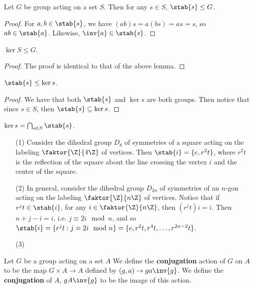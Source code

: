 \begin{lemma}\label{2.2.4}
    Let $G$ be group acting on a set  $S$. Then for any  $s \in S$,  $\stab{s}
    \leq G$.
\end{lemma}
\begin{proof}
    For $a,b \in \stab{s}$, we have $(ab)s=a(bs)=as=s$, so $ab \in \stab{a}$.
    Likewise, $\inv{a} \in \stab{s}$.
\end{proof}
\begin{corollary}
    $\ker{S} \leq G$.
\end{corollary}
\begin{proof}
    The proof is identical to that of the above lemma.
\end{proof}
\begin{corollary}
    $\stab{s} \leq \ker{s}$.
\end{corollary}
\begin{proof}
    We have that both $\stab{s}$ and $\ker{s}$ are both groups. Then notice that
    since $s \in S$, then  $\stab{s} \subseteq \ker{s}$.
\end{proof}
\begin{corollary}
    $\ker{s}=\bigcap_{s \in S}{\stab{s}}$.
\end{corollary}

\begin{example}
    \begin{enumerate}
        \item[(1)] Consider the dihedral group $D_8$ of symmetries of a square
            acting on the labeling $\faktor{\Z}{4\Z}$ of vertices. Then
            $\stab{i}=\{e,r^2t\}$, where  $r^2t$ is the reflection of the square
            about the line crossing the vertex  $i$ and the center of the
            square.

        \item [(2)] In general, consider the dihedral group $D_{2n}$ of
            symmetries of an $n$-gon acting on the labeling  $\faktor{\Z}{n\Z}$
            of vertices. Notice that if  $r^jt \in \stab{i}$, for any $i \in
            \faktor{\Z}{n\Z}$, then $(r^jt)i=i$. Then $n+j-i=i$, i.e. $j \equiv
            2i \mod{n}$, and so $\stab{i}=\{r^jt : j \equiv 2i \mod{n}\}=\{e,
            r^2t, r^4t, \dots, r^{2n-2}t\}$.

        \item[(3)]
    \end{enumerate}
\end{example}

\begin{definition}
    Let $G$ be a group acting on a set $A$ We define the \textbf{conjugation}
    action of $G$ on  $A$ to be the map $G \times A \rightarrow A$
    defined by $(g,a) \rightarrow ga\inv{g}$. We define the \textbf{conjugation}
    of $A$, $gA\inv{g}$ to be the image of this action.
\end{definition}


